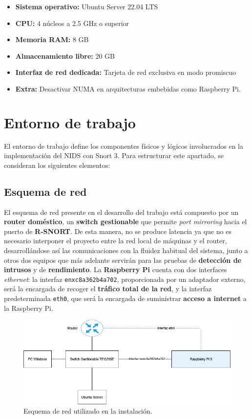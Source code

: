 \documentclass[11pt,a4paper,twoside]{report}
\begin{document}
\begin{itemize}
	\item \textbf{Sistema operativo:} Ubuntu Server 22.04 LTS
	\item \textbf{CPU:} 4 núcleos a 2.5 GHz o superior
	\item \textbf{Memoria RAM:} 8 GB
	\item \textbf{Almacenamiento libre:} 20 GB
	\item \textbf{Interfaz de red dedicada:} Tarjeta de red exclusiva en modo promiscuo
	\item \textbf{Extra:} Desactivar NUMA en arquitecturas embebidas como Raspberry Pi.
\end{itemize}

\section{Entorno de trabajo}

El entorno de trabajo define los componentes físicos y lógicos involucrados en la implementación del NIDS con Snort 3. Para estructurar este apartado, se consideran los siguientes elementos:

\subsection{Esquema de red}

El esquema de red presente en el desarrollo del trabajo está compuesto por un \textbf{router doméstico}, un \textbf{switch gestionable} que permite \textit{port mirroring} hacia el puerto de \textbf{R-SNORT}. De esta manera, no se produce latencia ya que no es necesario interponer el proyecto entre la red local de máquinas y el router, desarrollándose así las comunicaciones con la fluidez habitual del sistema, junto a otros dos equipos que más adelante servirán para las pruebas de \textbf{detección de intrusos} y de \textbf{rendimiento}. La \textbf{Raspberry Pi} cuenta con dos interfaces \textit{ethernet}: la interfaz \texttt{enxc8a362b4a702}, proporcionada por un adaptador externo, será la encargada de recoger el \textbf{tráfico total de la red}, y la interfaz predeterminada \texttt{eth0}, que será la encargada de suministrar \textbf{acceso a internet} a la Raspberry Pi.

\begin{figure}[H]
	\centering
	\includegraphics[scale=0.4]{script_automatico/network.png}
	\caption{Esquema de red utilizado en la instalación.}
\end{figure}
\end{document}
